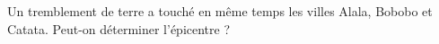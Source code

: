 
\begin{exercice}\label{exosmath-0926}

Un tremblement de terre a touché en même temps les villes Alala, Bobobo et Catata. Peut-on déterminer l'épicentre ?
\begin{center}
   
\end{center}


\end{exercice}
